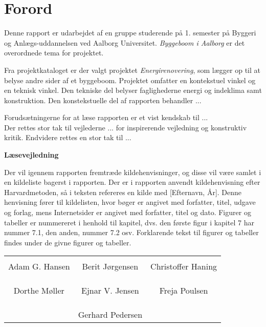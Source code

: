 \chapter*{Forord}

Denne rapport er udarbejdet af en gruppe studerende på 1. semester på Byggeri og Anlægs-uddannelsen ved Aalborg Universitet. \textit{Byggeboom i Aalborg} er det overordnede tema for projektet.

Fra projektkataloget er der valgt projektet \textit{Energirenovering}, som lægger op til at belyse andre sider af et byggeboom. Projektet omfatter en kontekstuel vinkel og en teknisk vinkel. Den tekniske del belyser faglighederne energi og indeklima samt konstruktion. Den konstekstuelle del af rapporten behandler ...

Forudsætningerne for at læse rapporten er et vist kendskab til ... \\
Der rettes stor tak til vejlederne ... for inspirerende vejledning og konstruktiv kritik. Endvidere rettes en stor tak til ...

\textbf{Læsevejledning}

Der vil igennem rapporten fremtræde kildehenvisninger, og disse vil være samlet i en kildeliste bagerst i rapporten. Der er i rapporten anvendt kildehenvisning efter Harvardmetoden, så i teksten refereres en kilde med [Efternavn, År]. Denne henvisning fører til kildelisten, hvor bøger er angivet med forfatter, titel, udgave og forlag, mens Internetsider er angivet med forfatter, titel og dato. Figurer og tabeller er nummereret i henhold til kapitel, dvs. den første figur i kapitel 7 har nummer 7.1, den anden, nummer 7.2 osv. Forklarende tekst til figurer og tabeller findes under de givne figurer og tabeller.

\phantom{Luft}

\phantom{Luft}

\begin{table}[H]
	\centering
		\begin{tabular}{c c c}
			\underline{\phantom{mmmmmmmmmmmmmm}} & \underline{\phantom{mmmmmmmmmmmmmm}} & \underline{\phantom{mmmmmmmmmmmmmm}} \\
			Adam  G. Hansen			& Berit Jørgensen 		& Christoffer Haning 			\\
			&&\\
			&&\\
			\underline{\phantom{mmmmmmmmmmmmmm}} & \underline{\phantom{mmmmmmmmmmmmmm}} & \underline{\phantom{mmmmmmmmmmmmmm}} \\
			Dorthe Møller			& Ejnar V. Jensen 		& Freja Poulsen 				\\
			&&\\
			&&\\
		 							& \underline{\phantom{mmmmmmmmmmmmmm}} 	&			\\														
									& Gerhard Pedersen 							& 												
		\end{tabular}
\end{table}